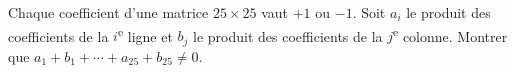 Chaque coefficient d'une matrice $25 \times 25$ vaut $+1$ ou $-1$. Soit $a_i$ le produit des coefficients de la $i$\textsuperscript{e} ligne et $b_j$ le produit des coefficients de la $j$\textsuperscript{e} colonne. Montrer que $a_1 + b_1 + \cdots + a_{25} + b_{25} \neq 0$.
